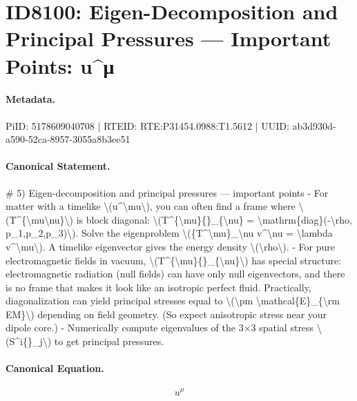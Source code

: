 \section*{ID8100: Eigen-Decomposition and Principal Pressures — Important Points: u\textasciicircum{}μ}
\paragraph{Metadata.}
PiID: 5178609040708 | RTEID: RTE:P31454.0988:T1.5612 | UUID: ab3d930d-a590-52ca-8957-3055a8b3ee51

\paragraph{Canonical Statement.}
\# 5) Eigen-decomposition and principal pressures — important points - For matter with a timelike \textbackslash{}(u\textasciicircum{}\textbackslash{}mu\textbackslash{}), you can often find a frame where \textbackslash{}(T\textasciicircum{}\{\textbackslash{}mu\textbackslash{}nu\}\textbackslash{}) is block diagonal: \textbackslash{}(T\textasciicircum{}\{\textbackslash{}mu\}\{\}\_\{\textbackslash{}nu\} = \textbackslash{}mathrm\{diag\}(-\textbackslash{}rho, p\_1,p\_2,p\_3)\textbackslash{}). Solve the eigenproblem \textbackslash{}(\{T\textasciicircum{}\textbackslash{}mu\}\_\textbackslash{}nu v\textasciicircum{}\textbackslash{}nu = \textbackslash{}lambda v\textasciicircum{}\textbackslash{}mu\textbackslash{}). A timelike eigenvector gives the energy density \textbackslash{}(\textbackslash{}rho\textbackslash{}). - For pure electromagnetic fields in vacuum, \textbackslash{}(T\textasciicircum{}\{\textbackslash{}mu\}\{\}\_\{\textbackslash{}nu\}\textbackslash{}) has special structure: electromagnetic radiation (null fields) can have only null eigenvectors, and there is no frame that makes it look like an isotropic perfect fluid. Practically, diagonalization can yield principal stresses equal to \textbackslash{}(\textbackslash{}pm \textbackslash{}mathcal\{E\}\_\{\textbackslash{}rm EM\}\textbackslash{}) depending on field geometry. (So expect anisotropic stress near your dipole core.) - Numerically compute eigenvalues of the 3×3 spatial stress \textbackslash{}(S\textasciicircum{}i\{\}\_j\textbackslash{}) to get principal pressures.

\paragraph{Canonical Equation.}
\[
u^\mu
\]


